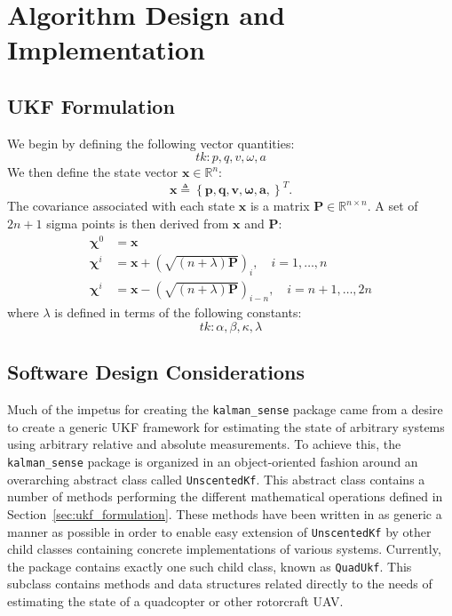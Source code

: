 \chapter{Algorithm Design and Implementation} \label{ch:alg_design}

\section{UKF Formulation}

We begin by defining the following vector quantities:
%
\begin{equation}
tk: p, q, v, \omega, a
\end{equation}
%
We then define the state vector $\mathbf{x} \in \mathbb{R}^{n}$:
%
\begin{equation}
\mathbf{x} \triangleq \left\lbrace
\mathbf{p},
\mathbf{q},
\mathbf{v},
\mathbf{\omega},
\mathbf{a},
\right\rbrace ^{T}.
\end{equation}
%
The covariance associated with each state $\mathbf{x}$ is a matrix $\mathbf{P} \in \mathbb{R}^{n \times n}$. A set of $2n + 1$ sigma points is then derived from $\mathbf{x}$ and $\mathbf{P}$:
%
\begin{align}
\mathbf{\chi}^{0} &= \mathbf{x} \nonumber\\
\mathbf{\chi}^{i} &= \mathbf{x} + \left( \sqrt{\left( n + \lambda \right) \mathbf{P} } \right)_{i}, \quad i = 1, \dots, n \\
\mathbf{\chi}^{i} &= \mathbf{x} - \left( \sqrt{\left( n + \lambda \right) \mathbf{P} } \right)_{i-n}, \quad i = n+1, \dots, 2n \nonumber
\end{align}
%
where $\lambda$ is defined in terms of the following constants:
%
\begin{equation}
tk: \alpha, \beta, \kappa, \lambda
\end{equation}

\section{Software Design Considerations}

Much of the impetus for creating the \texttt{kalman\_sense} package came from a desire to create a generic UKF framework for estimating the state of arbitrary systems using arbitrary relative and absolute measurements. To achieve this, the \texttt{kalman\_sense} package is organized in an object-oriented fashion around an overarching abstract class called \texttt{UnscentedKf}. This abstract class contains a number of methods performing the different mathematical operations defined in Section~\ref{sec:ukf_formulation}. These methods have been written in as generic a manner as possible in order to enable easy extension of \texttt{UnscentedKf} by other child classes containing concrete implementations of various systems. Currently, the package contains exactly one such child class, known as \texttt{QuadUkf}. This subclass contains methods and data structures related directly to the needs of estimating the state of a quadcopter or other rotorcraft UAV.

